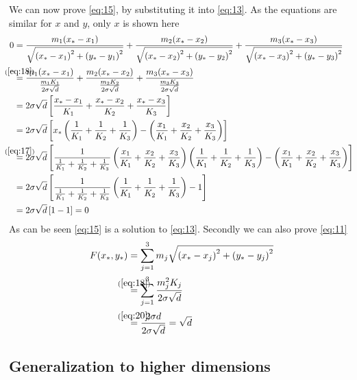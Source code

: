 We can now prove \cref{eq:15}, by substituting it into \cref{eq:13}. As the
equations are similar for $x$ and $y$, only $x$ is shown here
%
\begin{align}
  0
  &= \frac{m_1 (x_\ast - x_1)}{\sqrt{{(x_\ast - x_1)}^2 + {(y_\ast - y_1)}^2}} +
    \frac{m_2 (x_\ast - x_2)}{\sqrt{{(x_\ast - x_2)}^2 + {(y_\ast - y_2)}^2}} +
    \frac{m_3 (x_\ast - x_3)}{\sqrt{{(x_\ast - x_3)}^2 + {(y_\ast - y_3)}^2}} \\
  &\stackrel{\mathclap{(\ref{eq:18})}}=
    \frac{m_1 (x_\ast - x_1)}{\frac{m_1 K_1}{2 \sigma \sqrt{d}}} +
    \frac{m_2 (x_\ast - x_2)}{\frac{m_2 K_2}{2 \sigma \sqrt{d}}} +
    \frac{m_3 (x_\ast - x_3)}{\frac{m_3 K_3}{2 \sigma \sqrt{d}}} \\
  &= 2 \sigma \sqrt{d} \left[
    \frac{x_\ast - x_1}{K_1} +
    \frac{x_\ast - x_2}{K_2} +
    \frac{x_\ast - x_3}{K_3} \right] \\
  &= 2 \sigma \sqrt{d} \left[
    x_\ast \left( \frac{1}{K_1} + \frac{1}{K_2} + \frac{1}{K_3} \right) -
    \left( \frac{x_1}{K_1} + \frac{x_2}{K_2} + \frac{x_3}{K_3} \right)
    \right] \\
  &\stackrel{\mathclap{(\ref{eq:17})}}=
    2 \sigma \sqrt{d} \left[
    \frac{1}{\frac{1}{K_1} + \frac{1}{K_2} + \frac{1}{K_3}} \left( \frac{x_1}{K_1} +
    \frac{x_2}{K_2} + \frac{x_3}{K_3} \right)
    \left( \frac{1}{K_1} + \frac{1}{K_2} + \frac{1}{K_3} \right) -
    \left( \frac{x_1}{K_1} + \frac{x_2}{K_2} + \frac{x_3}{K_3} \right)
    \right] \\
  &= 2 \sigma \sqrt{d} \left[
    \frac{1}{\frac{1}{K_1} + \frac{1}{K_2} + \frac{1}{K_3}}
    \left( \frac{1}{K_1} + \frac{1}{K_2} + \frac{1}{K_3} \right) -
    1 \right] \\
  &= 2 \sigma \sqrt{d} \left[ 1 - 1 \right] = 0
\end{align}
%
As can be seen \cref{eq:15} is a solution to \cref{eq:13}.  Secondly we can also
prove \cref{eq:11}
%
\begin{align}
  F(x_\ast,y_\ast)
  &= \sum_{j=1}^3 m_j \sqrt{{(x_\ast - x_j)}^2 + {(y_\ast - y_j)}^2} \\
  &\stackrel{\mathclap{(\ref{eq:18})}}{=}
    \sum_{j=1}^3 \frac{m_j^2 K_j}{2 \sigma \sqrt{d}} \\
  &\stackrel{\mathclap{(\ref{eq:20})}}{=}
    \frac{2 \sigma d}{2 \sigma \sqrt{d}} = \sqrt{d}
\end{align}

\subsection{Generalization to higher dimensions}
\label{sec:gener-high-dimens}


